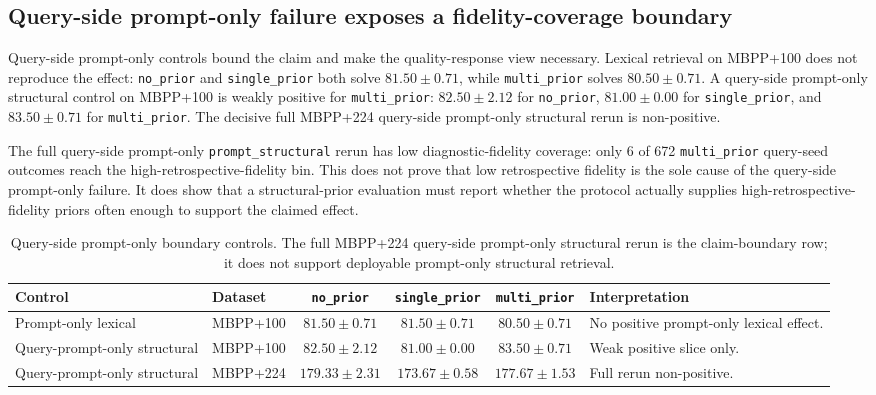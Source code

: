 \documentclass{article}
\begin{document}
\subsection{Query-side prompt-only failure exposes a fidelity-coverage boundary}
Query-side prompt-only controls bound the claim and make the quality-response view necessary. Lexical retrieval on MBPP+100 does not reproduce the effect: \texttt{no\_prior} and \texttt{single\_prior} both solve $81.50 \pm 0.71$, while \texttt{multi\_prior} solves $80.50 \pm 0.71$. A query-side prompt-only structural control on MBPP+100 is weakly positive for \texttt{multi\_prior}: $82.50 \pm 2.12$ for \texttt{no\_prior}, $81.00 \pm 0.00$ for \texttt{single\_prior}, and $83.50 \pm 0.71$ for \texttt{multi\_prior}. The decisive full MBPP+224 query-side prompt-only structural rerun is non-positive.

The full query-side prompt-only \texttt{prompt\_structural} rerun has low diagnostic-fidelity coverage: only 6 of 672 \texttt{multi\_prior} query-seed outcomes reach the high-retrospective-fidelity bin. This does not prove that low retrospective fidelity is the sole cause of the query-side prompt-only failure. It does show that a structural-prior evaluation must report whether the protocol actually supplies high-retrospective-fidelity priors often enough to support the claimed effect.

\begin{table}[t]
\centering
\scriptsize
\setlength{\tabcolsep}{3pt}
\begin{tabularx}{\linewidth}{llcccY}
\toprule
Control & Dataset & \texttt{no\_prior} & \texttt{single\_prior} & \texttt{multi\_prior} & Interpretation \\
\midrule
Prompt-only lexical & MBPP+100 & $81.50\pm0.71$ & $81.50\pm0.71$ & $80.50\pm0.71$ & No positive prompt-only lexical effect. \\
Query-prompt-only structural & MBPP+100 & $82.50\pm2.12$ & $81.00\pm0.00$ & $83.50\pm0.71$ & Weak positive slice only. \\
Query-prompt-only structural & MBPP+224 & $179.33\pm2.31$ & $173.67\pm0.58$ & $177.67\pm1.53$ & Full rerun non-positive. \\
\bottomrule
\end{tabularx}
\caption{Query-side prompt-only boundary controls. The full MBPP+224 query-side prompt-only structural rerun is the claim-boundary row; it does not support deployable prompt-only structural retrieval.}
\label{tab:prompt-only}
\end{table}
\end{document}
